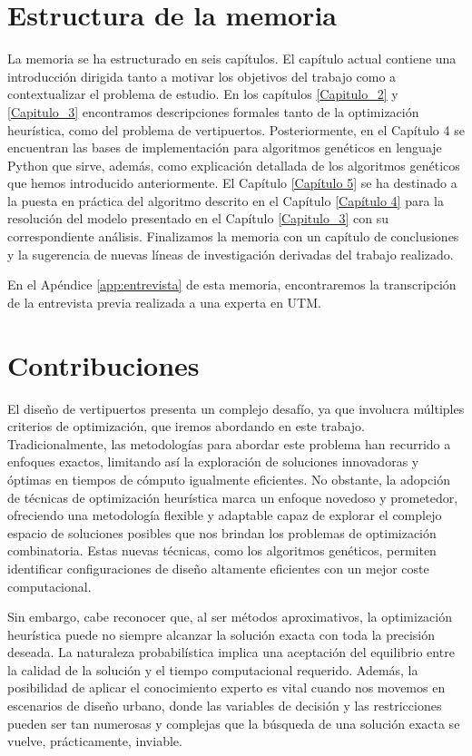\documentclass[12pt,a4paper]{book}
\begin{document}
\section{Estructura de la memoria} \label{Subsubsec: 1_3}
La memoria se ha estructurado en seis capítulos. El capítulo actual contiene una introducción dirigida tanto a motivar los objetivos del trabajo como a contextualizar el problema de estudio. En los capítulos \ref{Capitulo_2} y \ref{Capitulo_3} encontramos descripciones formales tanto de la optimización heurística, como del problema de vertipuertos. Posteriormente, en el Capítulo 4 se encuentran las bases de implementación para algoritmos genéticos en lenguaje Python que sirve, además, como explicación detallada de los algoritmos genéticos que hemos introducido anteriormente. El Capítulo \ref{Capítulo 5} se ha destinado a la puesta en práctica del algoritmo descrito en el Capítulo \ref{Capítulo 4} para la resolución del modelo presentado en el Capítulo \ref{Capitulo_3} con su correspondiente análisis. Finalizamos la memoria con un capítulo de conclusiones y la sugerencia de nuevas líneas de investigación derivadas del trabajo realizado. 

En el Apéndice \ref{app:entrevista} de esta memoria, encontraremos la transcripción de la entrevista previa realizada a una experta en UTM.  

\section{Contribuciones} \label{Subsec: 1_4}
El diseño de vertipuertos presenta un complejo desafío, ya que involucra múltiples criterios de optimización, que iremos abordando en este trabajo. Tradicionalmente, las metodologías para abordar este problema han recurrido a enfoques exactos, limitando así la exploración de soluciones innovadoras y óptimas en tiempos de cómputo igualmente eficientes. No obstante, la adopción de técnicas de optimización heurística marca un enfoque novedoso y prometedor, ofreciendo una metodología flexible y adaptable capaz de explorar el complejo espacio de soluciones posibles que nos brindan los problemas de optimización combinatoria.  Estas nuevas técnicas, como los algoritmos genéticos, permiten identificar configuraciones de diseño altamente eficientes con un mejor coste computacional.

Sin embargo, cabe reconocer que, al ser métodos aproximativos, la optimización heurística puede no siempre alcanzar la solución exacta con toda la precisión deseada. La naturaleza probabilística implica una aceptación del equilibrio entre la calidad de la solución y el tiempo computacional requerido. Además, la posibilidad de aplicar el conocimiento experto es vital cuando nos movemos en escenarios de diseño urbano, donde las variables de decisión y las restricciones pueden ser tan numerosas y complejas que la búsqueda de una solución exacta se vuelve, prácticamente, inviable.
\end{document}
